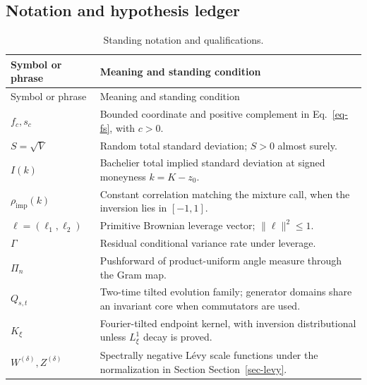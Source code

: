 \documentclass[
  english,
  11pt,
  letterpaper,
  DIV=11,
  numbers=noendperiod]{scrartcl}
\theoremstyle{plain}
\theoremstyle{plain}
\theoremstyle{plain}
\theoremstyle{plain}
\theoremstyle{remark}
\begin{document}
\subsection{Notation and hypothesis
ledger}\label{notation-and-hypothesis-ledger}

\begin{longtable}[]{@{}
  >{\raggedright\arraybackslash}p{}
  >{\raggedright\arraybackslash}p{}@{}}
\caption{Standing notation and
qualifications.}\label{tbl-notation}\tabularnewline
\toprule\noalign{}
\begin{minipage}[b]{\linewidth}\raggedright
Symbol or phrase
\end{minipage} & \begin{minipage}[b]{\linewidth}\raggedright
Meaning and standing condition
\end{minipage} \\
\midrule\noalign{}
\endfirsthead
\toprule\noalign{}
\begin{minipage}[b]{\linewidth}\raggedright
Symbol or phrase
\end{minipage} & \begin{minipage}[b]{\linewidth}\raggedright
Meaning and standing condition
\end{minipage} \\
\midrule\noalign{}
\endhead
\bottomrule\noalign{}
\endlastfoot
\(f_c,s_c\) & Bounded coordinate and positive complement in
Eq.~\ref{eq-fs}, with \(c>0\). \\
\(S=\sqrt V\) & Random total standard deviation; \(S>0\) almost
surely. \\
\(I(k)\) & Bachelier total implied standard deviation at signed
moneyness \(k=K-z_0\). \\
\(\rho_{\mathrm{imp}}(k)\) & Constant correlation matching the mixture
call, when the inversion lies in \([-1,1]\). \\
\(\ell=(\ell_1,\ell_2)\) & Primitive Brownian leverage vector;
\(\|\ell\|^2\le1\). \\
\(\Gamma\) & Residual conditional variance rate under leverage. \\
\(\Pi_n\) & Pushforward of product-uniform angle measure through the
Gram map. \\
\(Q_{s,t}\) & Two-time tilted evolution family; generator domains share
an invariant core when commutators are used. \\
\(K_\xi\) & Fourier-tilted endpoint kernel, with inversion
distributional unless \(L^1_\xi\) decay is proved. \\
\(W^{(\delta)},Z^{(\delta)}\) & Spectrally negative Lévy scale functions
under the normalization in Section Section~\ref{sec-levy}. \\
\end{longtable}
\end{document}
